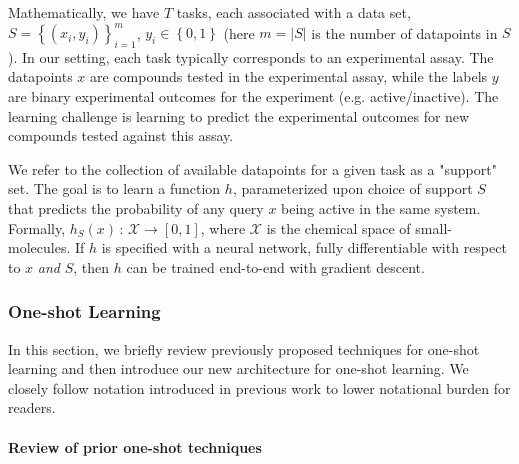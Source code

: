 
Mathematically, we have $T$ tasks, each associated with a data set, $S=\left\{\left(x_i,y_i\right)\right\}_{i=1}^{m}$, $y_i\in\left\{0,1\right\}$ (here $m = |S|$ is the number of datapoints in $S$). In our setting, each task typically corresponds to an experimental assay. The datapoints $x$ are compounds tested in the experimental assay, while the labels $y$ are binary experimental outcomes for the experiment (e.g. active/inactive). The learning challenge is learning to predict the experimental outcomes for new compounds tested against this assay.

We refer to the collection of available datapoints for a given task as a "support" set. The goal is to learn a function $h$, parameterized upon choice of support $S$ that predicts the probability of any query $x$ being active in the same system. Formally, $h_S(x)\,:\,\mathcal{X}\rightarrow\left[0,1\right]$, where $\mathcal{X}$ is the chemical space of small-molecules. If $h$ is specified with a neural network, fully differentiable with respect to $x$ \emph{and} $S$, then $h$ can be trained end-to-end with gradient descent.


\subsubsection{One-shot Learning}
In this section, we briefly review previously proposed techniques for one-shot learning and then introduce our new architecture for one-shot learning. We closely follow notation introduced in previous work \cite{vinyals2016matching} to lower notational burden for readers.
\paragraph{Review of prior one-shot techniques}

